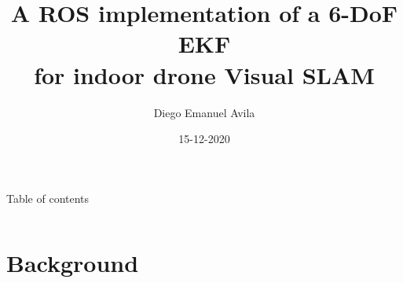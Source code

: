 \documentclass[serif]{beamer}
\title{A ROS implementation of a 6-DoF EKF \\ for indoor drone Visual SLAM}
\author{Diego Emanuel Avila}
\date{15-12-2020}
\begin{document}
    \begin{frame}
        \maketitle
    \end{frame}

    \begin{frame}{Table of contents}
        \begin{columns}[t]
            \begin{column}{.5\textwidth}
                \tableofcontents[sections={1-2}]
            \end{column}
            \begin{column}{.5\textwidth}
                \tableofcontents[sections={3-4}]
            \end{column}
        \end{columns}
    \end{frame}

    \section{Background}
\end{document}
